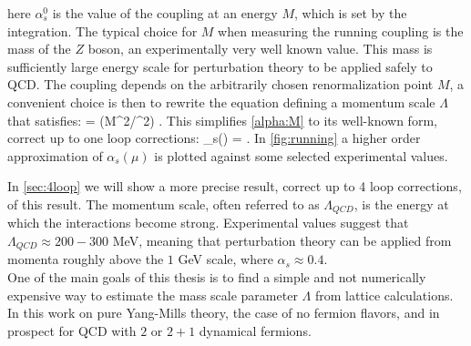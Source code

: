     \label{alpha:M}
\eeq  
here $\alpha_s^0$ is the value of the coupling at an energy $M$, which is set by the integration. The typical choice for $M$ when measuring the running coupling is the mass of the $Z$ boson, an experimentally very well known value. This mass is sufficiently large energy scale for perturbation theory to be applied safely to QCD. The coupling depends on the arbitrarily chosen renormalization point $M$, a convenient choice is then to rewrite the equation defining a momentum scale $\Lambda$ that satisfies:
 = \log(M^2/\Lambda^2) .
\eeq  
This simplifies \cref{alpha:M} to its well-known form, correct up to one loop corrections:
\beq
    \alpha_s(\mu) = .
    \label{alpha:1loop} 
\eeq
In \cref{fig:running} a higher order approximation of $\alpha_s(\mu)$ is plotted against some selected experimental values. 

In \cref{sec:4loop} we will show a more precise result, correct up to 4 loop corrections, of this result. The momentum scale, often referred to as $\Lambda_{QCD}$, is the energy at which the interactions become strong. Experimental values \cite{dissertori_9._2016} suggest that $\Lambda_{QCD} \approx 200-300$ MeV, meaning that perturbation theory can be applied from momenta roughly above the $1$ GeV scale, where $\alpha_s\approx 0.4$. \\
One of the main goals of this thesis is to find a simple and not numerically expensive way to estimate the mass scale parameter $\Lambda$ from lattice calculations. In this work on pure Yang-Mills theory, the case of no fermion flavors, and in prospect for QCD with $2$ or $2+1$ dynamical fermions. 

